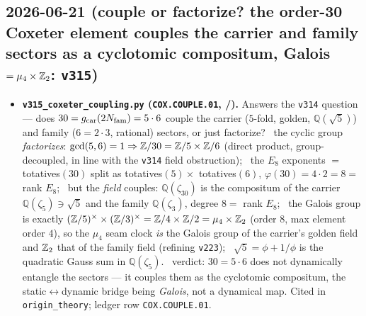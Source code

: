 \subsection*{2026-06-21 (couple or factorize? the order-30 Coxeter element couples the carrier and family sectors as a cyclotomic compositum, Galois $=\mu_4\times\mathbb{Z}_2$: \texttt{v315})}
\begin{itemize}
\item \textbf{\texttt{v315\_coxeter\_coupling.py} (\texttt{COX.COUPLE.01}, \mE/\mC).} Answers the \texttt{v314}
  question --- does $30=g_{\mathrm{car}}(2N_{\mathrm{fam}})=5\cdot6$ couple the carrier ($5$-fold, golden, $\mathbb Q(\sqrt5)$) and family
  ($6=2\cdot3$, rational) sectors, or just factorize? \mE\ the cyclic group \emph{factorizes}: $\gcd(5,6)=1\Rightarrow
  \mathbb{Z}/30=\mathbb{Z}/5\times\mathbb{Z}/6$ (direct product, group-decoupled, in line with the \texttt{v314} field obstruction); \mE\ the
  $E_8$ exponents $=$ totatives$(30)$ split as totatives$(5)\times$ totatives$(6)$, $\varphi(30)=4\cdot2=8=$ rank
  $E_8$; \mE\ but the \emph{field} couples: $\mathbb Q(\zeta_{30})$ is the compositum of the carrier
  $\mathbb Q(\zeta_5)\ni\sqrt5$ and the family $\mathbb Q(\zeta_3)$, degree $8=$ rank $E_8$; \mE\ the Galois group is
  exactly $(\mathbb{Z}/5)^\times\times(\mathbb{Z}/3)^\times=\mathbb{Z}/4\times\mathbb{Z}/2=\mu_4\times\mathbb{Z}_2$ (order $8$, max element order $4$), so the
  $\mu_4$ seam clock \emph{is} the Galois group of the carrier's golden field and $\mathbb{Z}_2$ that of the family field
  (refining \texttt{v223}); \mE\ $\sqrt5=\phi+1/\phi$ is the quadratic Gauss sum in $\mathbb Q(\zeta_5)$. \mC\ verdict:
  $30=5\cdot6$ does not dynamically entangle the sectors --- it couples them as the cyclotomic compositum, the
  static$\leftrightarrow$dynamic bridge being \emph{Galois}, not a dynamical map. Cited in \texttt{origin\_theory};
  ledger row \texttt{COX.COUPLE.01}.
\end{itemize}

